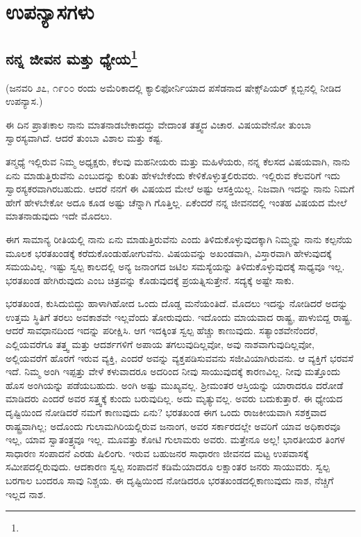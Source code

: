 
\part{ಉಪನ್ಯಾಸಗಳು}

\chapter[ನನ್ನ ಜೀವನ ಮತ್ತು ಧ್ಯೇಯ]{ನನ್ನ ಜೀವನ ಮತ್ತು ಧ್ಯೇಯ\protect\footnote{}}

\begin{center}
(ಜನವರಿ ೨೭, ೧೯೦೦ ರಂದು ಅಮೆರಿಕಾದಲ್ಲಿ ಕ್ಯಾಲಿಫೋರ್ನಿಯಾದ ಪಸೆಡನಾದ ಷೇಕ್ಸ್‌ಪಿಯರ್ ಕ್ಲಬ್ಬಿನಲ್ಲಿ ನೀಡಿದ ಉಪನ್ಯಾಸ.)
\end{center}

ಈ ದಿನ ಪ್ರಾತಃಕಾಲ ನಾನು ಮಾತನಾಡಬೇಕಾದದ್ದು ವೇದಾಂತ ತತ್ತ್ವದ ವಿಚಾರ. ವಿಷಯವೇನೋ ತುಂಬಾ ಸ್ವಾರಸ್ಯವಾಗಿದೆ. ಆದರೆ ತುಂಬಾ ವಿಶಾಲ ಮತ್ತು ಕಷ್ಟ.

ತನ್ಮಧ್ಯೆ ಇಲ್ಲಿರುವ ನಿಮ್ಮ ಅಧ್ಯಕ್ಷರು, ಕೆಲವು ಮಹನೀಯರು ಮತ್ತು ಮಹಿಳೆಯರು, ನನ್ನ ಕೆಲಸದ ವಿಷಯವಾಗಿ, ನಾನು ಏನು ಮಾಡುತ್ತಿರುವೆನು ಎಂಬುದನ್ನು ಕುರಿತು ಹೇಳಬೇಕೆಂದು ಕೇಳಿಕೊಳ್ಳುತ್ತಲಿರುವರು. ಇಲ್ಲಿರುವ ಕೆಲವರಿಗೆ ಇದು ಸ್ವಾರಸ್ಯಕರವಾಗಿರಬಹುದು. ಆದರೆ ನನಗೆ ಈ ವಿಷಯದ ಮೇಲೆ ಅಷ್ಟು ಆಸಕ್ತಿಯಿಲ್ಲ. ನಿಜವಾಗಿ ಇದನ್ನು ನಾನು ನಿಮಗೆ ಹೇಗೆ ಹೇಳಬೇಕೋ ಅದೂ ಕೂಡ ಅಷ್ಟು ಚೆನ್ನಾಗಿ ಗೊತ್ತಿಲ್ಲ. ಏಕೆಂದರೆ ನನ್ನ ಜೀವನದಲ್ಲಿ ಇಂತಹ ವಿಷಯದ ಮೇಲೆ ಮಾತನಾಡುವುದು ಇದೇ ಮೊದಲು.

ಈಗ ಸಾಮಾನ್ಯ ರೀತಿಯಲ್ಲಿ ನಾನು ಏನು ಮಾಡುತ್ತಿರುವೆನು ಎಂದು ತಿಳಿದುಕೊಳ್ಳುವುದಕ್ಕಾಗಿ ನಿಮ್ಮನ್ನು ನಾನು ಕಲ್ಪನೆಯ ಮೂಲಕ ಭರತಖಂಡಕ್ಕೆ ಕರೆದುಕೊಂಡು\break ಹೋಗುವೆನು. ವಿಷಯವನ್ನು ಅಖಂಡವಾಗಿ, ವಿಸ್ತಾರವಾಗಿ ಹೇಳುವುದಕ್ಕೆ ಸಮಯವಿಲ್ಲ. ಇಷ್ಟು ಸ್ವಲ್ಪ ಕಾಲದಲ್ಲಿ ಅನ್ಯ ಜನಾಂಗದ ಜಟಿಲ ಸಮಸ್ಯೆಯನ್ನು ತಿಳಿದುಕೊಳ್ಳುವುದಕ್ಕೆ ಸಾಧ್ಯವೂ ಇಲ್ಲ. ಭರತಖಂಡ ಹೇಗಿರುವುದು ಎಂಬ ಚಿತ್ರವನ್ನು ಕೊಡುವುದಕ್ಕೆ ಪ್ರಯತ್ನಿಸುತ್ತೇನೆ. ಸದ್ಯಕ್ಕೆ ಅಷ್ಟೇ ಸಾಕು.

ಭರತಖಂಡ, ಕುಸಿದುಬಿದ್ದು ಹಾಳಾಗಿಹೋದ ಒಂದು ದೊಡ್ಡ ಮನೆಯಂತಿದೆ. ಮೊದಲು ಇದನ್ನು ನೋಡಿದರೆ ಅದನ್ನು ಉತ್ತಮ ಸ್ಥಿತಿಗೆ ತರಲು ಅವಕಾಶವೇ ಇಲ್ಲವೆಂದು ತೋರುವುದು. ಇದೊಂದು ಮಾಯವಾದ ರಾಷ್ಟ್ರ, ಪಾಳುಬಿದ್ದ ರಾಷ್ಟ್ರ. ಆದರೆ ಸಾವಧಾನದಿಂದ ಇದನ್ನು ಪರೀಕ್ಷಿಸಿ. ಆಗ ಇದಕ್ಕಿಂತ ಸ್ವಲ್ಪ ಹೆಚ್ಚು ಕಾಣುವುದು. ಸತ್ಯಾಂಶವೇನೆಂದರೆ, ಎಲ್ಲಿಯವರೆಗೂ ತತ್ತ್ವ ಮತ್ತು ಆದರ್ಶಗಳಿಗೆ ಅಪಾಯ ತಗಲುವುದಿಲ್ಲವೋ, ಅವು ನಾಶವಾಗುವುದಿಲ್ಲವೋ, ಅಲ್ಲಿಯವರೆಗೆ ಹೊರಗೆ ಇರುವ ವ್ಯಕ್ತಿ, ಎಂದರೆ ಅವನ್ನು ವ್ಯಕ್ತಪಡಿಸುವವನು ಸಜೀವಿಯಾಗಿರುವನು. ಆ ವ್ಯಕ್ತಿಗೆ ಭರವಸೆ ಇದೆ. ನಿಮ್ಮ ಅಂಗಿ ಇಪ್ಪತ್ತು ವೇಳೆ ಕಳುವಾದರೂ ಅದರಿಂದ ನೀವು ಸಾಯುವುದಕ್ಕೆ ಕಾರಣವಿಲ್ಲ. ನೀವು ಮತ್ತೊಂದು ಹೊಸ ಅಂಗಿಯನ್ನು ಪಡೆಯಬಹುದು. ಅಂಗಿ ಅಷ್ಟು ಮುಖ್ಯವಲ್ಲ. ಶ‍್ರೀಮಂತರ ಆಸ್ತಿಯನ್ನು ಯಾರಾದರೂ ದರೋಡೆ ಮಾಡಿದರು ಎಂದರೆ ಅವರ ಸತ್ತ್ವಕ್ಕೆ ಕುಂದು ಬರುವುದಿಲ್ಲ. ಅದು ಮೃತ್ಯುವಲ್ಲ. ಅವರು ಬದುಕುತ್ತಾರೆ. ಈ ಧ್ಯೇಯದ ದೃಷ್ಟಿಯಿಂದ ನೋಡಿದರೆ ನಮಗೆ ಕಾಣುವುದು ಏನು? ಭರತಖಂಡ ಈಗ ಒಂದು ರಾಜಕೀಯವಾಗಿ ಸಶಕ್ತವಾದ ರಾಷ್ಟ್ರವಾಗಿಲ್ಲ; ಅದೊಂದು ಗುಲಾಮಗಿರಿಯಲ್ಲಿರುವ ಜನಾಂಗ, ಅವರ ಸರ್ಕಾರದಲ್ಲೇ ಅವರಿಗೆ ಯಾವ ಅಧಿಕಾರವೂ ಇಲ್ಲ, ಯಾವ ಸ್ವಾತಂತ್ರ್ಯವೂ ಇಲ್ಲ. ಮೂವತ್ತು ಕೋಟಿ ಗುಲಾಮರು ಅವರು. ಮತ್ತೇನೂ ಅಲ್ಲ! ಭಾರತೀಯರ ತಿಂಗಳ ಸಾಧಾರಣ ಸಂಪಾದನೆ ಎರಡು ಷಿಲಿಂಗು. ಇರುವ ಬಹುಜನರ ಸಾಧಾರಣ ಜೀವನದ ಮಟ್ಟ ಉಪವಾಸಕ್ಕೆ ಸಮೀಪದಲ್ಲಿರುವುದು. ಆದಕಾರಣ ಸ್ವಲ್ಪ ಸಂಪಾದನೆ ಕಡಿಮೆಯಾದರೂ ಲಕ್ಷಾಂತರ ಜನರು ಸಾಯುವರು. ಸ್ವಲ್ಪ ಬರಗಾಲ ಬಂದರೂ ಸಾವು ನಿಶ್ಚಯ. ಈ ದೃಷ್ಟಿಯಿಂದ ನೋಡಿದರೂ ಭರತಖಂಡದಲ್ಲಿ\break ಕಾಣುವುದು ನಾಶ, ನೆಚ್ಚಿಗೆ ಇಲ್ಲದ ನಾಶ.

